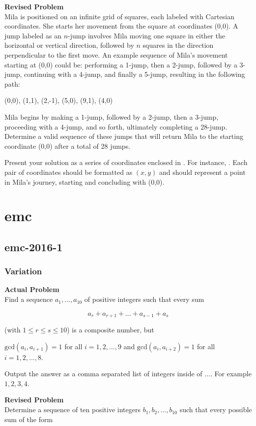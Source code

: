 \textbf{Revised Problem}\\
Mila is positioned on an infinite grid of squares, each labeled with Cartesian coordinates. She starts her movement from the square at coordinates (0,0). A jump labeled as an $n$-jump involves Mila moving one square in either the horizontal or vertical direction, followed by $n$ squares in the direction perpendicular to the first move. An example sequence of Mila's movement starting at (0,0) could be: performing a 1-jump, then a 2-jump, followed by a 3-jump, continuing with a 4-jump, and finally a 5-jump, resulting in the following path:

(0,0), (1,1), (2,-1), (5,0), (9,1), (4,0)

Mila begins by making a 1-jump, followed by a 2-jump, then a 3-jump, proceeding with a 4-jump, and so forth, ultimately completing a 28-jump. Determine a valid sequence of these jumps that will return Mila to the starting coordinate (0,0) after a total of 28 jumps.

Present your solution as a series of coordinates enclosed in . For instance, . Each pair of coordinates should be formatted as $(x, y)$ and should represent a point in Mila's journey, starting and concluding with (0,0).

\section{emc}
\subsection{emc-2016-1}
\subsubsection{Variation}
\textbf{Actual Problem}\\
Find a sequence $a_1, ..., a_{10}$ of positive integers such that every sum

$$a_r + a_{r+1} + ... + a_{s-1} + a_s$$

(with $1 \leqslant r \leqslant s \leqslant 10$) is a composite number, but

$\text{gcd}(a_i, a_{i+1}) = 1$ for all $i = 1,2,...,9$ and $\text{gcd}(a_i, a_{i+2}) = 1$ for all $i = 1,2,...,8$.

Output the answer as a comma separated list of integers inside of $\boxed{...}$. For example $\boxed{1,2,3,4}$.

\textbf{Revised Problem}\\
Determine a sequence of ten positive integers $b_1, b_2, ..., b_{10}$ such that every possible sum of the form

